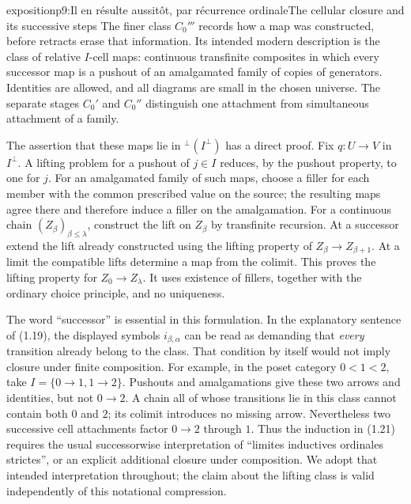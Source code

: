 \begin{dcomment}{exposition}{p9:Il en résulte aussitôt, par récurrence ordinale}{The cellular closure and its successive steps}
The finer class $C_0'''$ records how a map was constructed, before retracts erase that information. Its intended modern description is the class of relative $I$-cell maps: continuous transfinite composites in which every successor map is a pushout of an amalgamated family of copies of generators. Identities are allowed, and all diagrams are small in the chosen universe. The separate stages $C_0'$ and $C_0''$ distinguish one attachment from simultaneous attachment of a family.

The assertion that these maps lie in ${}^{\perp}(I^\perp)$ has a direct proof. Fix $q:U\to V$ in $I^\perp$. A lifting problem for a pushout of $j\in I$ reduces, by the pushout property, to one for $j$. For an amalgamated family of such maps, choose a filler for each member with the common prescribed value on the source; the resulting maps agree there and therefore induce a filler on the amalgamation. For a continuous chain $(Z_\beta)_{\beta\leq\lambda}$, construct the lift on $Z_\beta$ by transfinite recursion. At a successor extend the lift already constructed using the lifting property of $Z_\beta\to Z_{\beta+1}$. At a limit the compatible lifts determine a map from the colimit. This proves the lifting property for $Z_0\to Z_\lambda$. It uses existence of fillers, together with the ordinary choice principle, and no uniqueness.

The word ``successor'' is essential in this formulation. In the explanatory sentence of (1.19), the displayed symbols $i_{\beta,\alpha}$ can be read as demanding that \emph{every} transition already belong to the class. That condition by itself would not imply closure under finite composition. For example, in the poset category $0<1<2$, take $I=\{0\to1,1\to2\}$. Pushouts and amalgamations give these two arrows and identities, but not $0\to2$. A chain all of whose transitions lie in this class cannot contain both $0$ and $2$; its colimit introduces no missing arrow. Nevertheless two successive cell attachments factor $0\to2$ through $1$. Thus the induction in (1.21) requires the usual successorwise interpretation of ``limites inductives ordinales strictes'', or an explicit additional closure under composition. We adopt that intended interpretation throughout; the claim about the lifting class is valid independently of this notational compression.
\end{dcomment}

